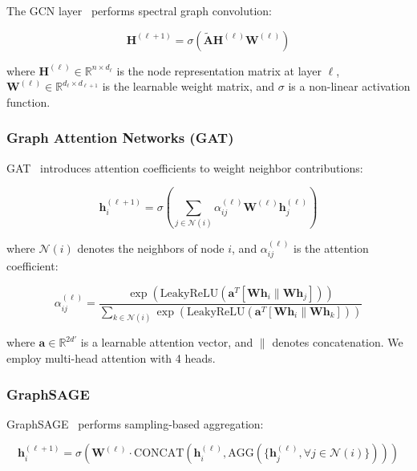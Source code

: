 \documentclass[pdflatex,sn-mathphys-num]{sn-jnl}
\theoremstyle{thmstyleone}%
\theoremstyle{thmstyletwo}%
\theoremstyle{thmstylethree}%
\begin{document}
The GCN layer~\cite{kipf2017semi} performs spectral graph convolution:

\begin{equation}
    \mathbf{H}^{(\ell+1)} = \sigma\left(\tilde{\mathbf{A}} \mathbf{H}^{(\ell)} \mathbf{W}^{(\ell)}\right)
\end{equation}

where $\mathbf{H}^{(\ell)} \in \mathbb{R}^{n \times d_\ell}$ is the node representation matrix at layer $\ell$, $\mathbf{W}^{(\ell)} \in \mathbb{R}^{d_\ell \times d_{\ell+1}}$ is the learnable weight matrix, and $\sigma$ is a non-linear activation function.

\subsubsection{Graph Attention Networks (GAT)}

GAT~\cite{veličković2018graph} introduces attention coefficients to weight neighbor contributions:

\begin{equation}
    \mathbf{h}_i^{(\ell+1)} = \sigma\left(\sum_{j \in \mathcal{N}(i)} \alpha_{ij}^{(\ell)} \mathbf{W}^{(\ell)} \mathbf{h}_j^{(\ell)}\right)
\end{equation}

where $\mathcal{N}(i)$ denotes the neighbors of node $i$, and $\alpha_{ij}^{(\ell)}$ is the attention coefficient:

\begin{equation}
    \alpha_{ij}^{(\ell)} = \frac{\exp\left(\text{LeakyReLU}\left(\mathbf{a}^T [\mathbf{W}\mathbf{h}_i \| \mathbf{W}\mathbf{h}_j]\right)\right)}{\sum_{k \in \mathcal{N}(i)} \exp\left(\text{LeakyReLU}\left(\mathbf{a}^T [\mathbf{W}\mathbf{h}_i \| \mathbf{W}\mathbf{h}_k]\right)\right)}
\end{equation}

where $\mathbf{a} \in \mathbb{R}^{2d'}$ is a learnable attention vector, and $\|$ denotes concatenation. We employ multi-head attention with 4 heads.

\subsubsection{GraphSAGE}

GraphSAGE~\cite{hamilton2017inductive} performs sampling-based aggregation:

\begin{equation}
    \mathbf{h}_i^{(\ell+1)} = \sigma\left(\mathbf{W}^{(\ell)} \cdot \text{CONCAT}\left(\mathbf{h}_i^{(\ell)}, \text{AGG}\left(\{\mathbf{h}_j^{(\ell)}, \forall j \in \mathcal{N}(i)\}\right)\right)\right)
\end{equation}
\end{document}
